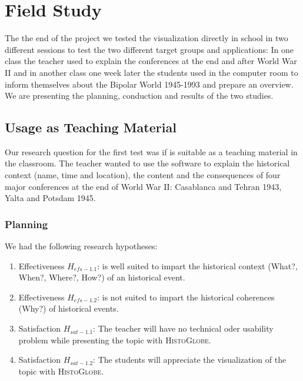 \section{Field Study} %
\label{sec:field_study}

The the end of the project we tested the visualization directly in school in two different sessions to test the two different target groups and applications: In one class the teacher used \HG to explain the conferences at the end and after World War II and in another class one week later the students used \HG in the computer room to inform themselves about the Bipolar World 1945-1993 and prepare an overview. We are presenting the planning, conduction and results of the two studies.


\subsection{Usage as Teaching Material} %
\label{sub:usage_as_teaching_material}

Our research question for the first test was if \HG is suitable as a teaching material in the classroom. The teacher wanted to use the software to explain the historical context (name, time and location), the content and the consequences of four major conferences at the end of World War II: Casablanca and Tehran 1943, Yalta and Potsdam 1945.

\subsubsection{Planning} %
\label{ssub:planning-1}

We had the following research hypotheses:
\begin{enumerate}
  \item Effectiveness $H_{efs-1.1}$: \HG is well suited to impart the historical context (What?, When?, Where?, How?) of an historical event.
  \item Effectiveness $H_{efs-1.2}$: \HG is not suited to impart the historical coherences (Why?) of historical events.
  \item Satisfaction $H_{sat-1.1}$:  The teacher will have no technical oder usability problem while presenting the topic with \textsc{HistoGlobe}.
  \item Satisfaction $H_{sat-1.2}$:  The students will appreciate the visualization of the topic with \textsc{HistoGlobe}.
\end{enumerate}

